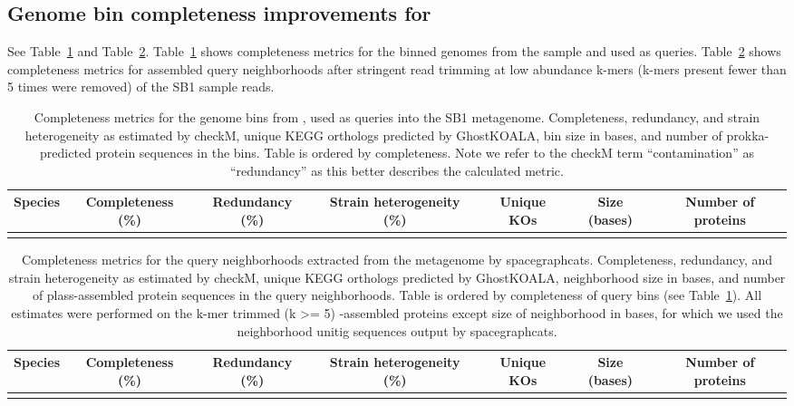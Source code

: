 \subsection{Genome bin completeness improvements for \hu}
\label{subsec:checkm}

See Table~\ref{tab:binstats} and 
Table~\ref{tab:nbhdstats}. Table~\ref{tab:binstats} shows completeness metrics
for the binned genomes from the \hu sample and used as 
queries.
Table~\ref{tab:nbhdstats} shows completeness metrics for \plass assembled
query neighborhoods after stringent read trimming at low abundance k-mers 
(k-mers present fewer than 5 times were removed) of the SB1 sample reads.  


\begin{table}
  \begin{tabular}{l c c c c c c}
    \toprule
    Species & Completeness (\%) & Redundancy (\%) & Strain heterogeneity (\%) & Unique KOs & Size (bases) & Number of proteins \\
    \midrule
    
\\ 
   \bottomrule
  \end{tabular}
  \caption{
   Completeness metrics for the \hu genome bins from \cite{Hu2016}, used as queries into the SB1 metagenome. Completeness, redundancy, and 
   strain heterogeneity as estimated
   by checkM, unique KEGG orthologs predicted by GhostKOALA, bin size in 
   bases, and number of prokka-predicted protein sequences in the \hu bins. 
   Table is ordered by completeness. Note we refer to the checkM term 
   ``contamination'' as ``redundancy'' as this better describes the calculated
   metric.}
  \label{tab:binstats}
 \end{table}

\begin{table}
  \begin{tabular}{l c c c c c c}
    \toprule
    Species & Completeness (\%) & Redundancy (\%) & Strain heterogeneity (\%) & Unique KOs & Size (bases) & Number of proteins \\
    \midrule
    
\\
    \bottomrule
  \end{tabular}
  \caption{
   Completeness metrics for the query neighborhoods extracted from the \hu metagenome by {\sf spacegraphcats}. Completeness, redundancy, 
   and strain heterogeneity as estimated
   by checkM, unique KEGG orthologs predicted by GhostKOALA, neighborhood
   size in  bases, and number of plass-assembled  protein sequences in the
   query neighborhoods. Table is ordered by completeness of query bins (see 
   Table~\ref{tab:binstats}). All estimates were performed on the k-mer trimmed
   (k >= 5) \plass-assembled proteins except size of neighborhood in bases, 
   for which we used the neighborhood unitig sequences output by {\sf spacegraphcats}.}
  \label{tab:nbhdstats}
 \end{table}


